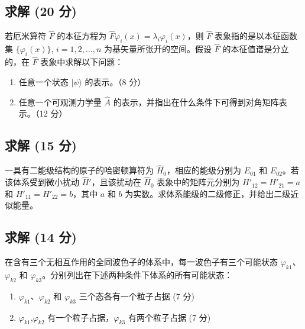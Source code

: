 \subsection{求解 (20 分)}
若厄米算符 $\hat{F}$ 的本征方程为 $\hat{F} \varphi_i(x) = \lambda_i \varphi_i(x)$，则 $\hat{F}$ 表象指的是以本征函数集 $\{\varphi_i(x)\}$, $i=1,2,\dots,n$ 为基矢量所张开的空间。假设 $\hat{F}$ 的本征值谱是分立的，在 $\hat{F}$ 表象中求解以下问题：
\begin{enumerate}
    \item 任意一个状态 $|\psi\rangle$ 的表示。（8 分）
    \item 任意一个可观测力学量 $\hat{A}$ 的表示，并指出在什么条件下可得到对角矩阵表示。（12 分）
\end{enumerate}
\subsection{求解 (15 分)}
一具有二能级结构的原子的哈密顿算符为 $\hat H_0$，相应的能级分别为 $E_{01}$ 和 $E_{02}$。若该体系受到微小扰动 $\hat H'$，且该扰动在 $\hat H_0$ 表象中的矩阵元分别为 $H'_{12} = H'_{21} = a$ 和 $H'_{11} = H'_{22} = b$，其中 $a$ 和 $b$ 为实数。求体系能级的二级修正，并给出二级近似能量。
\subsection{求解 (14 分)}
在含有三个无相互作用的全同波色子的体系中，每一波色子有三个可能状态 $\varphi_{k1}$、$\varphi_{k2}$ 和 $\varphi_{k3}$。分别列出在下述两种条件下体系的所有可能状态：
\begin{enumerate}
    \item $\varphi_{k1}$、$\varphi_{k2}$ 和 $\varphi_{k3}$ 三个态各有一个粒子占据 (7 分)
    \item $\varphi_{k1}$,$\varphi_{k2}$ 有一个粒子占据，$\varphi_{k3}$ 有两个粒子占据 (7 分)
\end{enumerate}